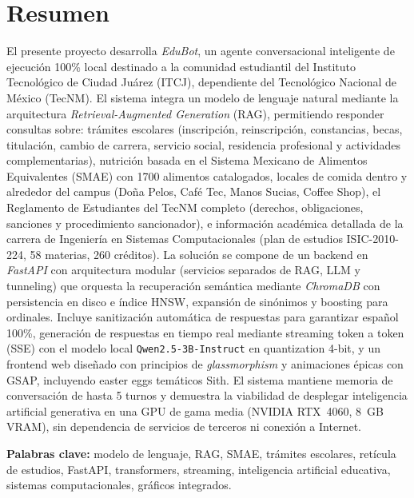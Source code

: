 
\section{Resumen}
\label{sec:resumen}

El presente proyecto desarrolla \textit{EduBot}, un agente conversacional inteligente de ejecución 100\% local destinado a la comunidad estudiantil del Instituto Tecnológico de Ciudad Juárez (ITCJ), dependiente del Tecnológico Nacional de México (TecNM). El sistema integra un modelo de lenguaje natural mediante la arquitectura \textit{Retrieval-Augmented Generation} (RAG), permitiendo responder consultas sobre: trámites escolares (inscripción, reinscripción, constancias, becas, titulación, cambio de carrera, servicio social, residencia profesional y actividades complementarias), nutrición basada en el Sistema Mexicano de Alimentos Equivalentes (SMAE) con 1700 alimentos catalogados, locales de comida dentro y alrededor del campus (Doña Pelos, Café Tec, Manos Sucias, Coffee Shop), el Reglamento de Estudiantes del TecNM completo (derechos, obligaciones, sanciones y procedimiento sancionador), e información académica detallada de la carrera de Ingeniería en Sistemas Computacionales (plan de estudios ISIC-2010-224, 58 materias, 260 créditos). La solución se compone de un backend en \textit{FastAPI} con arquitectura modular (servicios separados de RAG, LLM y tunneling) que orquesta la recuperación semántica mediante \textit{ChromaDB} con persistencia en disco e índice HNSW, expansión de sinónimos y boosting para ordinales. Incluye sanitización automática de respuestas para garantizar español 100\%, generación de respuestas en tiempo real mediante streaming token a token (SSE) con el modelo local \texttt{Qwen2.5-3B-Instruct} en quantization 4-bit, y un frontend web diseñado con principios de \textit{glassmorphism} y animaciones épicas con GSAP, incluyendo easter eggs temáticos Sith. El sistema mantiene memoria de conversación de hasta 5 turnos y demuestra la viabilidad de desplegar inteligencia artificial generativa en una GPU de gama media (NVIDIA RTX~4060, 8~GB VRAM), sin dependencia de servicios de terceros ni conexión a Internet.

\textbf{Palabras clave:} modelo de lenguaje, RAG, SMAE, trámites escolares, retícula de estudios, FastAPI, transformers, streaming, inteligencia artificial educativa, sistemas computacionales, gráficos integrados.


